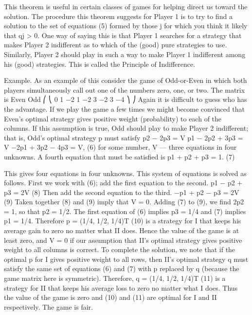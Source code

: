 \documentclass[]{report}
\begin{document}
This theorem is useful in certain classes of games for helping direct us toward the
solution. The procedure this theorem suggests for Player 1 is to try to find a solution to
the set of equations (5) formed by those j for which you think it likely that qj > 0. One
way of saying this is that Player 1 searches for a strategy that makes Player 2 indifferent
as to which of the (good) pure strategies to use. Similarly, Player 2 should play in such a
way to make Player 1 indifferent among his (good) strategies. This is called the Principle
of Indifference.

Example. As an example of this consider the game of Odd-or-Even in which both
players simultaneously call out one of the numbers zero, one, or two. The matrix is
Even
Odd
⎛
⎝
0 1 −2
1 −2 3
−2 3 −4
⎞
⎠
Again it is difficult to guess who has the advantage. If we play the game a few times we
might become convinced that Even’s optimal strategy gives positive weight (probability)
to each of the columns. If this assumption is true, Odd should play to make Player 2
indifferent; that is, Odd’s optimal strategy p must satisfy
p2 − 2p3 = V
p1 − 2p2 + 3p3 = V
−2p1 + 3p2 − 4p3 = V,
(6)
for some number, V — three equations in four unknowns. A fourth equation that must be
satisfied is
p1 + p2 + p3 = 1. (7)

This gives four equations in four unknowns. This system of equations is solved as follows.
First we work with (6); add the first equation to the second.
p1 − p2 + p3 = 2V (8)
Then add the second equation to the third.
−p1 + p2 − p3 = 2V (9)
Taken together (8) and (9) imply that V = 0. Adding (7) to (9), we find 2p2 = 1, so that
p2 = 1/2. The first equation of (6) implies p3 = 1/4 and (7) implies p1 = 1/4. Therefore
p = (1/4, 1/2, 1/4)T (10)
is a strategy for I that keeps his average gain to zero no matter what II does. Hence the
value of the game is at least zero, and V = 0 if our assumption that II’s optimal strategy
gives positive weight to all columns is correct. To complete the solution, we note that if the
optimal p for I gives positive weight to all rows, then II’s optimal strategy q must satisfy
the same set of equations (6) and (7) with p replaced by q (because the game matrix here
is symmetric). Therefore,
q = (1/4, 1/2, 1/4)T (11)
is a strategy for II that keeps his average loss to zero no matter what I does. Thus the
value of the game is zero and (10) and (11) are optimal for I and II respectively. The game
is fair.
\end{document}
